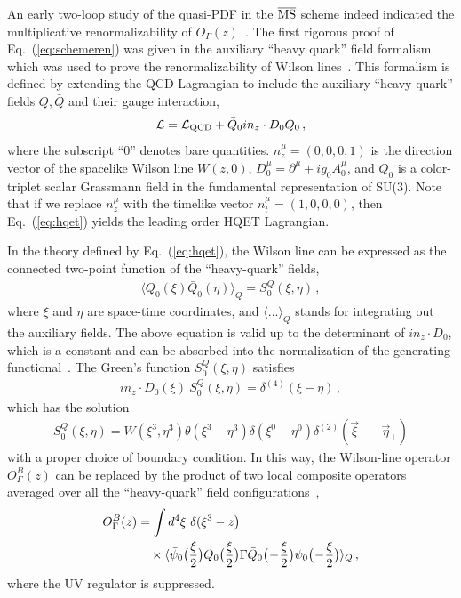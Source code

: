 \documentclass[aps,rmp,reprint,amsmath,amssymb,graphicx,longbibliography]{revtex4-1} %
\newcommand{\MS}{{\overline{\rm MS}}}
\newcommand{\nn}{\nonumber}
\DeclareRobustCommand{\eq}[1]{Eq.~(\ref{eq:#1})}
\begin{document}
An early two-loop study of the quasi-PDF in the $\MS$ scheme indeed indicated the multiplicative renormalizability of $O_\Gamma(z)$~\cite{Ji:2015jwa}. The first rigorous proof of \eq{schemeren} was given in the auxiliary ``heavy quark'' field formalism~\cite{Ji:2017oey,Green:2017xeu} which was used to prove the renormalizability of Wilson lines~\cite{Samuel:1978iy,Gervais:1979fv,Arefeva:1980zd,Dorn:1986dt}. This formalism is defined by extending the QCD Lagrangian to include the auxiliary ``heavy quark'' fields $Q,\bar{Q}$ and their gauge interaction,
\begin{align} \label{eq:hqet}
	{\cal L} = {\cal L}_{\rm QCD} + \bar{Q}_0in_z\cdot D_0 Q_0\,,
\end{align}
where the subscript ``0'' denotes bare quantities. $n_z^\mu=(0,0,0,1)$ is the direction vector of the spacelike Wilson line $W(z,0)$, $D_{0}^\mu = \partial^\mu + ig_0A_{0}^\mu$, and $Q_0$ is a color-triplet scalar Grassmann field in the fundamental representation of SU(3). Note that if we replace $n_z^\mu$ with the timelike vector $n_t^\mu=(1,0,0,0)$, then \eq{hqet} yields the leading order HQET Lagrangian.

In the theory defined by \eq{hqet}, the Wilson line can be expressed as the connected two-point function of the ``heavy-quark'' fields,
\begin{align}
	\langle Q_0(\xi)\bar{Q}_0(\eta) \rangle_Q = S_0^Q(\xi,\eta)\,,
\end{align}
where $\xi$ and $\eta$ are space-time coordinates, and
$\langle...\rangle_Q$ stands for integrating out the auxiliary fields. The above equation is valid up to the determinant of $in_z\cdot D_0$, which is a constant and can be absorbed into the normalization of the generating functional~\cite{Mannel:1991mc}. The Green's function $S_0^Q(\xi,\eta)$ satisfies
\begin{align}
	in_z\cdot D_0(\xi)\ S_0^Q(\xi,\eta) = \delta^{(4)}(\xi-\eta)\,,
\end{align}
which has the solution
\begin{align}
	S_0^Q(\xi,\eta)\! =\! W(\xi^3,\eta^3)\theta(\xi^3-\eta^3)\delta(\xi^0-\eta^0)\delta^{(2)}(\vec{\xi}_\perp -\vec{\eta}_\perp)
\end{align}
with a proper choice of boundary condition.
In this way, the Wilson-line operator $O^B_\Gamma(z)$ can be replaced by the product of two local composite operators averaged over all the ``heavy-quark'' field configurations~\cite{Dorn:1986dt},
\begin{align} \label{eq:product}
	O^B_{\Gamma}(z)& = \int d^4\xi\ \delta(\xi^3-z\big) \nn\\
	&\quad\times \langle \bar{\psi}_0\big({\xi\over2}\big) Q_0\big({\xi\over2}\big)\Gamma\bar{Q}_0\big(\!-\!{\xi\over2}\big)\psi_0\big(\!-\!{\xi\over2}\big)\rangle_Q\,,
\end{align}
where the UV regulator is suppressed.
\end{document}
